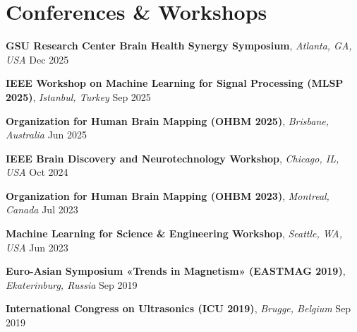 \documentclass[11pt,a4paper]{article}
\begin{document}
\section*{Conferences \& Workshops}
\newcommand{\confattend}[3]{\noindent\hspace*{1.2em}\textbf{#1}, \emph{#2} \hfill #3\par\vspace{0.05em}}
{\small
\confattend{GSU Research Center Brain Health Synergy Symposium}{Atlanta, GA, USA}{Dec 2025}
\confattend{IEEE Workshop on Machine Learning for Signal Processing (MLSP 2025)}{Istanbul, Turkey}{Sep 2025}
\confattend{Organization for Human Brain Mapping (OHBM 2025)}{Brisbane, Australia}{Jun 2025}
\confattend{IEEE Brain Discovery and Neurotechnology Workshop}{Chicago, IL, USA}{Oct 2024}
\confattend{Organization for Human Brain Mapping (OHBM 2023)}{Montreal, Canada}{Jul 2023}
\confattend{Machine Learning for Science \& Engineering Workshop}{Seattle, WA, USA}{Jun 2023}
\confattend{Euro-Asian Symposium «Trends in Magnetism» (EASTMAG 2019)}{Ekaterinburg, Russia}{Sep 2019}
\confattend{International Congress on Ultrasonics (ICU 2019)}{Brugge, Belgium}{Sep 2019}
}
\end{document}
